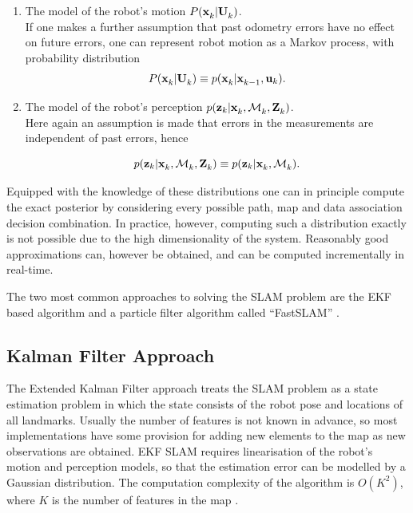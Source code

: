 \begin{enumerate}

\item The model of the robot's motion $P(\x{k}{}{} | \Uall{k}{})$. \\
If one makes a further assumption that past odometry errors have no
effect on future errors, one can represent robot motion as a Markov
process, with probability distribution 
\begin{equation}
 P(\x{k}{}{} | \Uall{k}{}) \equiv p(\x{k}{}{}| \x{k-1}{}{}, \U{k}).
\end{equation}


\item The model of the robot's perception
$p(\z{k}| \x{k}{}{},\map{k}{}{}, \Zall{k}{})$.\\
Here again an assumption is made that errors in the measurements are
independent of past errors, hence

\begin{equation}
p(\z{k}| \x{k}{}{},\map{k}{}{}, \Zall{k}{}) \equiv 
  p(\z{k}| \x{k}{}{},\map{k}{}{}).
\end{equation}

\end{enumerate}

Equipped with the knowledge of these distributions one can in
principle compute the exact posterior by considering every possible
path, map and data association decision combination. In practice,
however, computing such a distribution exactly is not possible due to
the high dimensionality of the system. Reasonably good approximations
can, however be obtained, and can be computed incrementally in
real-time.

The two most common approaches to solving the SLAM problem are the EKF
based algorithm \cite{ekf_slam} and a particle filter algorithm called
``FastSLAM'' \cite{fastslam}.

\subsection{Kalman Filter Approach}
\label{sec:EKF_SLAM}
The Extended Kalman Filter approach treats the SLAM problem as a state
estimation problem in which the state consists of the robot pose and
locations of all landmarks. Usually the number of features is not
known in advance, so most implementations have some provision for
adding new elements to the map as new observations are obtained. EKF
SLAM requires linearisation of the robot's motion and perception
models, so that the estimation error can be modelled by a Gaussian
distribution.  The computation complexity of the algorithm is
$O(K^2)$, where $K$ is the number of features in the map
\cite{ekf_slam}.

